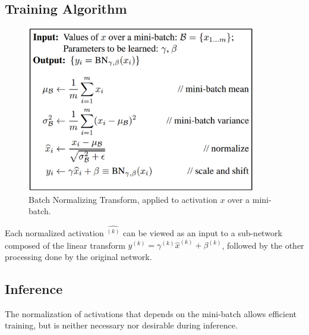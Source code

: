 \documentclass[a3paper, 12pt]{book} %
\begin{document}
\subsection{Training Algorithm}
\begin{figure}[htpb]
	\centering
	\includegraphics[width=10cm]{figures/bn_algorithm.png}
	\caption{Batch Normalizing Transform, applied to
activation $x$ over a mini-batch.}
	\label{fig:boat1}
\end{figure}
Each normalized activation $\hat{^{(k)}}$ can be viewed as an input to a sub-network composed of the linear transform $y^{(k)}=\gamma^{(k)}\hat{x}^{(k)}+\beta^{(k)}$, followed by the other processing done by the original network. 

\subsection{Inference}
The normalization of activations that
depends on the mini-batch allows efficient training, but is
neither necessary nor desirable during inference.
\end{document}
